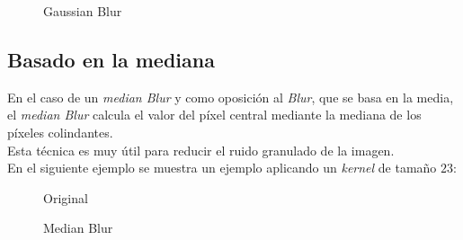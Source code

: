 \begin{figure}[H]
  \centering \setlength\fboxsep{0pt} \setlength\fboxrule{0.5pt}
  \caption{Gaussian Blur}
\end{figure}


\subsection{Basado en la mediana}\label{tecnica:blur-median}
En el caso de un \emph{median Blur} y como oposición al \emph{Blur},
que se basa en la media, el \emph{median Blur} calcula el valor
del píxel central mediante la mediana de los píxeles colindantes. \\
Esta técnica es muy útil para reducir el ruido granulado de la imagen.\\
En el siguiente ejemplo se muestra un ejemplo aplicando un
\emph{kernel} de tamaño $23$:

\begin{figure}[H]
  \caption{Original}
  \centering \setlength\fboxsep{0pt} \setlength\fboxrule{0.5pt}
\end{figure}

\begin{figure}[H]
  \centering \setlength\fboxsep{0pt} \setlength\fboxrule{0.5pt}
  \caption{Median Blur}
\end{figure}


